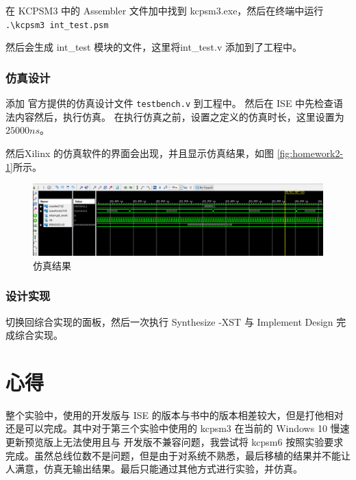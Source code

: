 \documentclass{ctexart}
\begin{document}
在 KCPSM3 中的 Assembler 文件加中找到 kcpsm3.exe，然后在终端中运行 \lstinline|.\kcpsm3 int_test.psm|

然后会生成 int\_test 模块的文件，这里将int\_test.v 添加到了工程中。

\subsubsection{仿真设计}

添加 官方提供的仿真设计文件 \verb|testbench.v| 到工程中。 然后在 ISE 中先检查语法内容然后，执行仿真。
在执行仿真之前，设置之定义的仿真时长，这里设置为 $25000ns$。

然后Xilinx 的仿真软件的界面会出现，并且显示仿真结果，如图 \ref{fig:homework2-1}所示。

\begin{figure}
\centering
\includegraphics[width=0.7\linewidth]{homework2-1}
\caption{仿真结果}
\label{fig:report3-4}
\end{figure}


\subsubsection{设计实现}

切换回综合实现的面板，然后一次执行 Synthesize -XST 与 Implement Design 完成综合实现。

        \section{心得}
        整个实验中，使用的开发版与 ISE 的版本与书中的版本相差较大，但是打他相对还是可以完成。其中对于第三个实验中使用的 kcpsm3 在当前的 Windows 10 慢速更新预览版上无法使用且与 开发版不兼容问题，我尝试将 kcpsm6 按照实验要求完成。虽然总线位数不是问题，但是由于对系统不熟悉，最后移植的结果并不能让人满意，仿真无输出结果。最后只能通过其他方式进行实验，并仿真。
\end{document}
